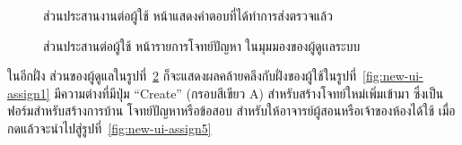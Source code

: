 \documentclass[12pt,one side,openright,a4paper]{cpe-thesis-th}
\newcommand{\thaijustify}[1]{%
  \par\hspace{30pt}\justifying
  #1
}
\begin{document}
                \begin{figure}[H]
                \centering
                    \caption[ส่วนประสานต่อผู้ใช้ หน้าแผงเขียนโปรแกรม (กดแสดงคำตอบที่ได้ทำการส่งตรวจแล้ว)]{ส่วนประสานงานต่อผู้ใช้ หน้าแสดงคำตอบที่ได้ทำการส่งตรวจแล้ว}
                    \label{fig:new-ui-code3}
                \end{figure}
                \begin{figure}[H]
                    \centering
                    \caption[ส่วนประสานต่อผู้ใช้ หน้ารายการโจทย์ปัญหาของผู้ดูเเลระบบ]{ส่วนประสานต่อผู้ใช้ หน้ารายการโจทย์ปัญหา ในมุมมองของผู้ดูเเลระบบ}
                    \label{fig:new-ui-assign2}
                \end{figure}
                \thaijustify{
                    ในอีกฝั่ง ส่วนของผู้ดูแลในรูปที่~\ref{fig:new-ui-assign2} ก็จะแสดงผลคล้ายคลึงกับฝั่งของผู้ใช้ในรูปที่~\ref{fig:new-ui-assign1} มีความต่างที่มีปุ่ม “Create” (กรอบสีเขียว A) สำหรับสร้างโจทย์ใหม่เพิ่มเข้ามา ซึ่งเป็นฟอร์มสำหรับสร้างการบ้าน โจทย์ปัญหาหรือข้อสอบ สำหรับให้อาจารย์ผู้สอนหรือเจ้าของห้องได้ใช้ เมื่อกดแล้วจะนำไปสู่รูปที่~\ref{fig:new-ui-assign5} 
                }
\end{document}
